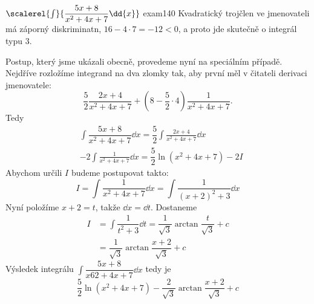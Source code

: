 \begin{mathexam}{\(\protect\scalerel{\int}{\dfrac{5x+8}{x^2+4x+7}\dd{x}}\)
  \hfill\cite[s.~73]{Knichal}}{exam140} 
  Kvadratický trojčlen ve jmenovateli má záporný diskriminatn, \(16-4\cdot7 = -12<0\), a proto jde
  skutečně o integrál typu 3.
  
  Postup, který jsme ukázali obecně, provedeme nyní na speciálním případě. Nejdříve rozložíme
  integrand na dva zlomky tak, aby první měl v čitateli derivaci jmenovatele: 
  \begin{equation*}
    \frac{5}{2}\frac{2x+4}{x^2+4x+7} + \left(8-\frac{5}{2}\cdot4\right)\frac{1}{x^2+4x+7}.
  \end{equation*}
  Tedy
  \begin{align*}
    & \int\dfrac{5x+8}{x^2+4x+7}\dd{x}  = \dfrac{5}{2}\int\frac{2x+4}{x^2+4x+7}\dd{x}  \\
    &-2\int\frac{1}{x^2+4x+7}\dd{x}     = \dfrac{5}{2}\ln(x^2+4x+7) - 2I
  \end{align*}
  Abychom určili \(I\) budeme postupovat takto:
  \begin{equation*}
    I = \int\dfrac{1}{x^2+4x+7}\dd{x} = \int\dfrac{1}{(x+2)^2+3}\dd{x} 
  \end{equation*}
  Nyní položíme \(x+2=t\), takže \(\dd{x}= \dd{t}\). Dostaneme
  \begin{align*}
    I &= \int\dfrac{1}{t^2+3}\dd{t} = \dfrac{1}{\sqrt{3}}\arctan\dfrac{t}{\sqrt{3}} + c \\
      &= \dfrac{1}{\sqrt{3}}\arctan\dfrac{x+2}{\sqrt{3}} + c
  \end{align*}
  Výsledek integrálu \(\int\dfrac{5x+8}{x62+4x+7}\dd{x}\) tedy je 
  \begin{equation*}
    \dfrac{5}{2}\ln(x^2+4x+7) - \dfrac{2}{\sqrt{3}}\arctan\dfrac{x+2}{\sqrt{3}} + c
  \end{equation*}
\end{mathexam}